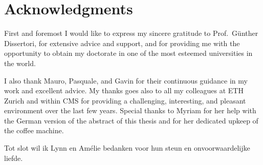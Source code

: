 \section*{Acknowledgments}

First and foremost I would like to express my sincere gratitude to Prof.\ G{\"u}nther Dissertori, for extensive advice and support, and for providing me with the opportunity to obtain my doctorate in one of the most esteemed universities in the world.


I also thank Mauro, Pasquale, and Gavin for their continuous guidance in my work and excellent advice.
% 
My thanks goes also to all my colleagues at ETH Zurich and within CMS for providing a challenging, interesting, and pleasant environment over the last few years.
% 
Special thanks to Myriam for her help with the German version of the abstract of this thesis and for her dedicated upkeep of the coffee machine.




Tot slot wil ik Lynn en Am{\'e}lie bedanken voor hun steun en onvoorwaardelijke liefde.


